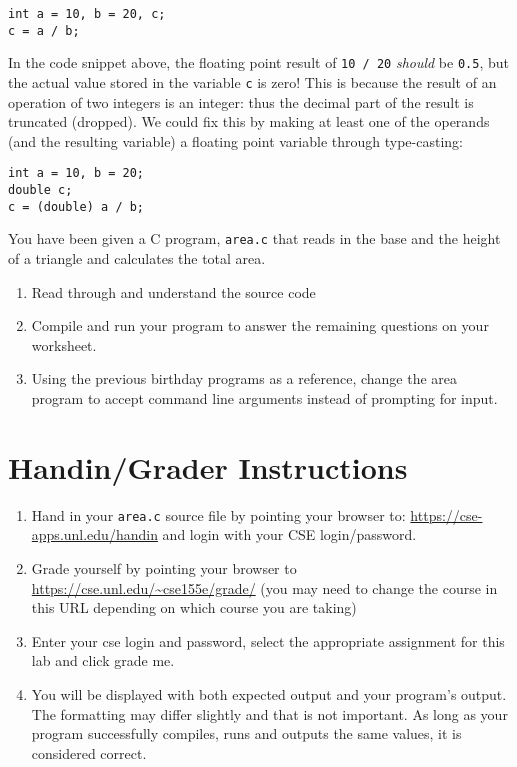 \documentclass[12pt]{scrartcl}
\begin{document}
\begin{verbatim}
int a = 10, b = 20, c;
c = a / b;
\end{verbatim}

In the code snippet above, the floating point result of \texttt{10 / 20} 
\emph{should} be \texttt{0.5}, but the actual value stored in the 
variable \texttt{c} is zero!  This is because the result of an operation 
of two integers is an integer: thus the decimal part of the result is truncated 
(dropped).  We could fix this by making at least one of the operands (and 
the resulting variable) a floating point variable through type-casting:

\begin{verbatim}
int a = 10, b = 20;
double c;
c = (double) a / b;
\end{verbatim}

You have been given a C program, \texttt{area.c} that reads 
in the base and the height of a triangle and calculates the total area.

\begin{enumerate}
  \item Read through and understand the source code
  \item Compile and run your program to answer the remaining questions 
  	on your worksheet.
  \item Using the previous birthday programs as a reference, change the
  	area program to accept command line arguments instead of prompting
	for input.
\end{enumerate}  

\section{Handin/Grader Instructions}

\begin{enumerate}
  \item Hand in your \texttt{area.c} source file by pointing your browser to:
  	\url{https://cse-apps.unl.edu/handin} and login with your CSE 
	login/password.
  \item Grade yourself by pointing your browser to 
  	\url{https://cse.unl.edu/~cse155e/grade/} (you may need to change the course
	in this URL depending on which course you are taking)
  \item Enter your cse login and password, select the appropriate assignment for 
  	this lab and click grade me.
  \item You will be displayed with both expected output and your program's output.  
	The formatting may differ slightly and that is not important.  As long as your 
	program successfully compiles, runs and outputs the same values, it is considered 
	correct.
\end{enumerate}  
\end{document}
